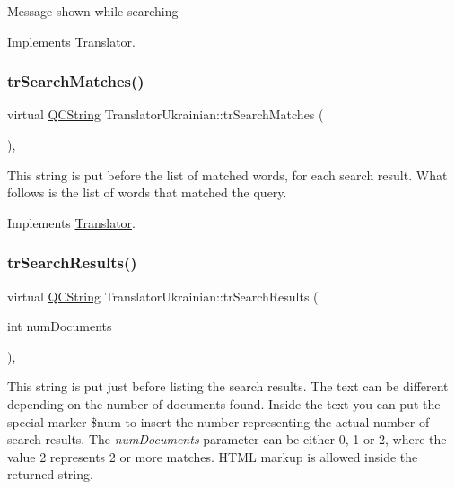 Message shown while searching 

Implements \mbox{\hyperlink{class_translator}{Translator}}.

\mbox{\label{class_translator_ukrainian_ab8f943013cbf8a2e81bdf51d81e48f3b}} 
\subsubsection{\texorpdfstring{trSearchMatches()}{trSearchMatches()}}
{\footnotesize\ttfamily virtual \mbox{\hyperlink{class_q_c_string}{Q\+C\+String}} Translator\+Ukrainian\+::tr\+Search\+Matches (\begin{DoxyParamCaption}{ }\end{DoxyParamCaption})\hspace{0.3cm}{\ttfamily [inline]}, {\ttfamily [virtual]}}

This string is put before the list of matched words, for each search result. What follows is the list of words that matched the query. 

Implements \mbox{\hyperlink{class_translator}{Translator}}.

\mbox{\label{class_translator_ukrainian_ac6dc51752a73dc442ff061d0b1fc24f9}} 
\subsubsection{\texorpdfstring{trSearchResults()}{trSearchResults()}}
{\footnotesize\ttfamily virtual \mbox{\hyperlink{class_q_c_string}{Q\+C\+String}} Translator\+Ukrainian\+::tr\+Search\+Results (\begin{DoxyParamCaption}\item[{int}]{num\+Documents }\end{DoxyParamCaption})\hspace{0.3cm}{\ttfamily [inline]}, {\ttfamily [virtual]}}

This string is put just before listing the search results. The text can be different depending on the number of documents found. Inside the text you can put the special marker \$num to insert the number representing the actual number of search results. The {\itshape num\+Documents} parameter can be either 0, 1 or 2, where the value 2 represents 2 or more matches. H\+T\+ML markup is allowed inside the returned string. 

